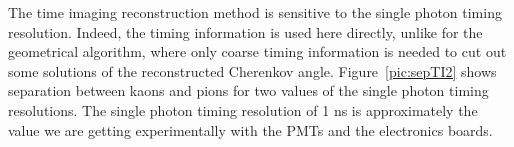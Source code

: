 
The time imaging reconstruction method is sensitive to the single photon timing resolution. Indeed, the timing information is used here directly, unlike for the geometrical algorithm, where only coarse timing information is needed to cut out some solutions of the reconstructed Cherenkov angle. Figure~\ref{pic:sepTI2} shows separation between kaons and pions for two values of the single photon timing resolutions. The single photon timing resolution of 1 ns is approximately the value we are getting experimentally with the PMTs and the electronics boards.

